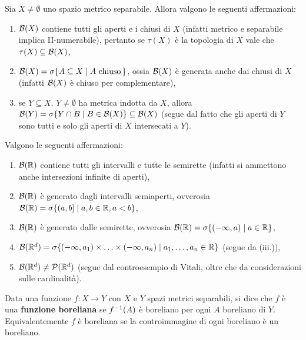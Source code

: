 \begin{multicols*}{2}
\begin{proposition}[Proprietà di $\BB(X)$]
    Sia $X \neq \emptyset$ uno spazio metrico separabile. Allora valgono
    le seguenti affermazioni:

    \begin{enumerate}[(i.)]
        \item $\BB(X)$ contiene tutti gli aperti e i chiusi di $X$ (infatti
        metrico e separabile implica II-numerabile), pertanto se $\tau(X)$ è la
        topologia di $X$ vale che $\tau(X) \subseteq \mathcal{B}(X)$,
        \item $\mathcal{B}(X) = \sigma \{ A \subseteq X \mid A \text{ chiuso}\, \}$, ossia
        $\BB(X)$ è generata anche dai chiusi di $X$ (infatti $\BB(X)$ è chiuso per
        complementare),
        \item se $Y \subseteq X$, $Y \neq \emptyset$ ha metrica indotta da $X$, allora
        $\mathcal{B}(Y) = \sigma \{ Y \cap B \mid B \in \mathcal{B}(X) \} \subseteq \mathcal{B}(X)$ (segue dal fatto che
        gli aperti di $Y$ sono tutti e solo gli aperti di $X$ intersecati a $Y$).
    \end{enumerate}
\end{proposition}

\begin{proposition}[Proprietà di $\BB(\RR^d)$]
    Valgono le seguenti affermazioni:
    \begin{enumerate}[(i.)]
        \item $\mathcal{B}(\mathbb{R})$ contiene tutti gli intervalli e tutte le semirette (infatti si ammettono anche intersezioni infinite di aperti),
        \item $\mathcal{B}(\mathbb{R})$ è generato dagli intervalli semiaperti, ovverosia $\mathcal{B}(\mathbb{R}) = \sigma \{ (a, b] \mid a, b \in \mathbb{R}, a < b \}$,
        \item $\mathcal{B}(\mathbb{R})$ è generato dalle semirette, ovverosia $\mathcal{B}(\mathbb{R}) = \sigma \{ (-\infty, a) \mid a \in \mathbb{R} \}$,
        \item $\mathcal{B}(\mathbb{R}^d) = \sigma \{ (-\infty, a_1) \times \ldots \times (-\infty, a_n) \mid a_1, \ldots, a_n \in \mathbb{R} \}$ (segue da (iii.)),
        \item $\mathcal{B}(\mathbb{R}^d) \neq \mathcal{P}(\mathbb{R}^d)$ (segue dal controesempio di Vitali, oltre che da considerazioni sulle cardinalità).
    \end{enumerate}
\end{proposition}

\begin{definition}
    Data una funzione $f : X \to Y$ con $X$ e $Y$ spazi metrici separabili, si dice che
    $f$ è una \textbf{funzione boreliana} se $f^{-1}(A)$ è boreliano per ogni
    $A$ boreliano di $Y$. Equivalentemente $f$ è boreliana se la controimmagine di ogni
    boreliano è un boreliano.
\end{definition}


\end{multicols*}
